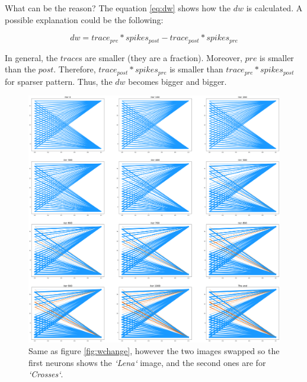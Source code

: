 \documentclass{article}
\begin{document}
	What can be the reason? The equation \ref{eq:dw} shows how the $dw$ is calculated. A possible explanation could be the following:
	
	\begin{equation}
		dw = trace_{pre} * spikes_{post} - trace_{post} * spikes_{pre}
		\label{eq:dw}
	\end{equation} 
	
	In general, the $trace$s are smaller (they are a fraction). Moreover, $pre$ is smaller than the $post$. Therefore, $trace_{post} * spikes_{pre}$ is smaller than $trace_{pre} * spikes_{post}$ for sparser pattern. Thus, the $dw$ becomes bigger and bigger.
	\begin{figure}
		\includegraphics[width=\textwidth]{weight_change_reverse.png}
		\caption{Same as figure \ref{fig:wchange}, however the two images swapped so the first neurons shows the \textit{`Lena`} image, and the second ones are for \textit{`Crosses`}.}
		\label{fig:wchangerev}
	\end{figure}
\end{document}
